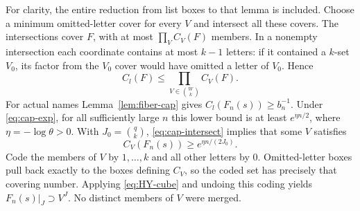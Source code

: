 \documentclass[11pt,reqno]{amsart}
\numberwithin{equation}{section}
\theoremstyle{definition}
\begin{document}
For clarity, the entire reduction from list boxes to that lemma is
included. Choose a minimum omitted-letter cover for every $V$ and
intersect all these covers. The intersections cover $F$, with at most
$\prod_V C_V(F)$ members. In a nonempty intersection each coordinate
contains at most $k-1$ letters: if it contained a $k$-set $V_0$, its
factor from the $V_0$ cover would have omitted a letter of $V_0$.
Hence
\begin{equation}\label{eq:cap-intersect}
 C_l(F)\le\prod_{V\in\binom Wk}C_V(F).
\end{equation}
For actual names Lemma~\ref{lem:fiber-cap} gives
$C_l(F_n(s))\ge b_n^{-1}$. Under \eqref{eq:cap-exp}, for all
sufficiently large $n$ this lower bound is at least
$e^{\eta n/2}$, where $\eta=-\log\theta>0$. With
$J_0=\binom qk$, \eqref{eq:cap-intersect} implies that some $V$
satisfies
\[
 C_V(F_n(s))\ge e^{\eta n/(2J_0)}.
\]
Code the members of $V$ by $1,\ldots,k$ and all other letters by
$0$. Omitted-letter boxes pull back exactly to the boxes defining
$C_V$, so the coded set has precisely that covering number. Applying
\eqref{eq:HY-cube} and undoing this coding yields
$F_n(s)|_J\supset V^J$. No distinct members of $V$ were merged.
\end{document}
